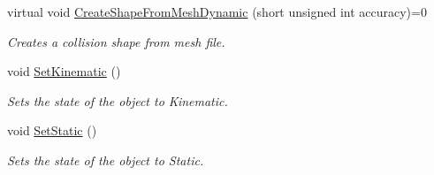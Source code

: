 \begin{DoxyCompactItemize}
virtual void \hyperlink{classphys_1_1ActorBase_aa41370f6d2031a9dad8df45bd7f3bcc6}{CreateShapeFromMeshDynamic} (short unsigned int accuracy)=0
\begin{DoxyCompactList}\small\item\em Creates a collision shape from mesh file. \item\end{DoxyCompactList}\item 
void \hyperlink{classphys_1_1ActorBase_acd5613286ec14fb2a8e5ed5f5003dc5f}{SetKinematic} ()
\begin{DoxyCompactList}\small\item\em Sets the state of the object to Kinematic. \item\end{DoxyCompactList}\item 
void \hyperlink{classphys_1_1ActorBase_af0219532fe71d1d84042a20a88fe5037}{SetStatic} ()
\begin{DoxyCompactList}\small\item\em Sets the state of the object to Static. \item\end{DoxyCompactList}\end{DoxyCompactItemize}
